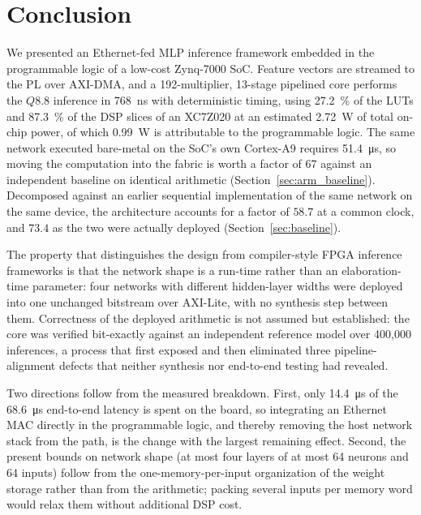 \documentclass[final,5p,times,twocolumn]{elsarticle}
\begin{document}
\section{Conclusion}
We presented an Ethernet-fed MLP inference framework embedded in the
programmable logic of a low-cost Zynq-7000 SoC. Feature vectors are streamed to
the PL over AXI-DMA, and a 192-multiplier, 13-stage pipelined core performs the
$Q8.8$ inference in \SI{768}{\nano\second} with deterministic timing, using
\SI{27.2}{\percent} of the LUTs and \SI{87.3}{\percent} of the DSP slices of an
XC7Z020 at an estimated \SI{2.72}{\watt} of total on-chip power, of which
\SI{0.99}{\watt} is attributable to the programmable logic. The same network
executed bare-metal on the SoC's own Cortex-A9 requires
\SI{51.4}{\micro\second}, so moving the computation into the fabric is worth a
factor of $67$ against an independent baseline on identical arithmetic
(Section~\ref{sec:arm_baseline}). Decomposed against an earlier sequential
implementation of the same network on the same device, the architecture accounts
for a factor of $58.7$ at a common clock, and $73.4$ as the two were actually
deployed (Section~\ref{sec:baseline}).

The property that distinguishes the design from compiler-style FPGA inference
frameworks is that the network shape is a run-time rather than an
elaboration-time parameter: four networks with different hidden-layer widths
were deployed into one unchanged bitstream over AXI-Lite, with no synthesis step
between them.
Correctness of the deployed arithmetic is not assumed but established: the core
was verified bit-exactly against an independent reference model over 400{,}000
inferences, a process that first exposed and then eliminated three
pipeline-alignment defects that neither synthesis nor end-to-end testing had
revealed.

Two directions follow from the measured breakdown. First, only
\SI{14.4}{\micro\second} of the \SI{68.6}{\micro\second} end-to-end latency is
spent on the board, so integrating an Ethernet MAC directly in the programmable
logic, and thereby removing the host network stack from the path, is the change
with the largest remaining effect. Second, the present bounds on network shape
(at most four layers of at most 64 neurons and 64 inputs) follow from the
one-memory-per-input organization of the weight storage rather than from the
arithmetic; packing several inputs per memory word would relax them without
additional DSP cost.
\end{document}
